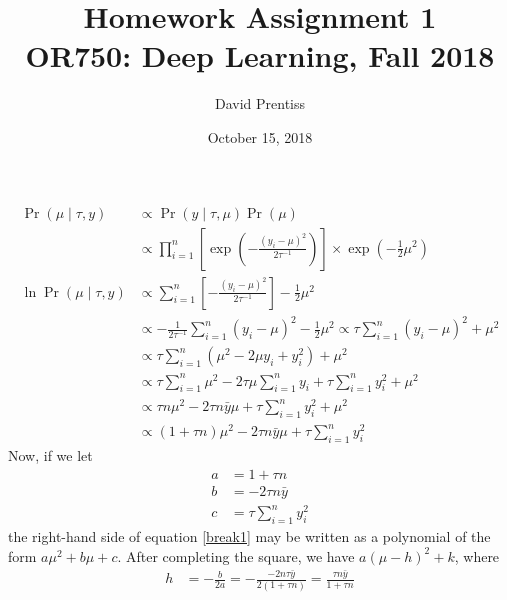 \documentclass[letterpaper]{amsart}
\begin{document}
\title[Homework 1]{Homework Assignment 1 \\ OR750: Deep Learning, Fall 2018}
\author{David Prentiss}
\date{October 15, 2018}
\maketitle

\section{}
\begin{align}
\Pr(\mu\mid\tau, y)
    &\propto
    \Pr(y\mid\tau, \mu)
    \Pr(\mu)
    \\
    &\propto
    \prod_{i=1}^n
    \left[
    \exp\left(-\frac{\left(y_i-\mu\right)^2}{2\tau^{-1}}\right)
    \right]
    \times
    \exp\left(-\frac{1}{2}\mu^2\right)
    \\
    \ln
    \Pr(\mu\mid\tau, y)
    &\propto
    \sum_{i=1}^n
    \left[
    -\frac{\left(y_i-\mu\right)^2}{2\tau^{-1}}
    \right]
    -\frac{1}{2}\mu^2
    \\
    &\propto
    -\frac{1}{2\tau^{-1}}
    \sum_{i=1}^n
    \left(y_i-\mu\right)^2
    -\frac{1}{2}\mu^2
    \propto
    \tau
    \sum_{i=1}^n
    \left(y_i-\mu\right)^2
    +\mu^2
    \\
    &\propto
    \tau
    \sum_{i=1}^n
    \left(\mu^2-2\mu y_i + y_i^2\right)
    +\mu^2
    \\
    &\propto
    \tau \sum_{i=1}^n \mu^2
    -2\tau\mu\sum_{i=1}^n y_i
    + \tau \sum_{i=1}^n y_i^2
    +\mu^2
    \\
    &\propto
    \tau n \mu^2
    -2\tau n\bar{y}\mu
    + \tau \sum_{i=1}^n y_i^2
    +\mu^2
    \\
    &\propto
    \left(1+\tau n\right) \mu^2
    -2\tau n\bar{y}\mu
    + \tau \sum_{i=1}^n y_i^2 \label{break1}
\end{align}
Now, if we let 
\begin{align}
    a &= 
    1+\tau n
    \\
    b &= 
    -2\tau n\bar{y}
    \\
    c &= 
    \tau \sum_{i=1}^n y_i^2
\end{align}
the right-hand side of equation \ref{break1} may be written as a polynomial of the form
$a\mu^2 + b\mu + c$.
After completing the square, we have
$a\left(\mu - h\right)^2+k$,
where
\begin{align}
    h &= -\frac{b}{2a}
    = -\frac{-2 n\tau\bar{y}}{2\left(1+\tau n\right)}
    = \frac{\tau n\bar{y}}{1+\tau n}
\end{align}
\end{document}
